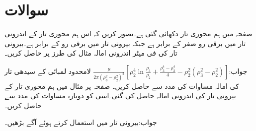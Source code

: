 \section*{سوالات}

صفحہ  میں ہم محوری تار دکھائی گئی ہے۔تصور کریں کہ اس ہم محوری تار کے اندرونی تار میں برقی رو صفر کے برابر ہے جبکہ بیرونی تار میں برقی رو  کے برابر ہے۔بیرونی تار کی فی میٹر اندرونی امالہ مثال  کی طرز پر حاصل کریں۔ 

جواب:$\frac{\mu}{2\pi \left(\rho_3^2-\rho_2^2 \right)^2} \left[\rho_2^4 \ln \frac{\rho_3}{\rho_2}+\frac{\rho_3^4-\rho_2^4}{4}-\rho_2^2 \left(\rho_3^2-\rho_2^2\right) \right]$
لامحدود لمبائی کے سیدھی تار کی امالہ مساوات  کی مدد سے حاصل کریں۔
صفحہ  پر مثال  میں ہم محوری تار کے بیرونی تار کی اندرونی امالہ حاصل کی گئی۔اسی کو دوبارہ مساوات  کی مدد سے حاصل کریں۔

جواب:بیرونی تار میں  استعمال کرتے ہوئے آگے بڑھیں۔
